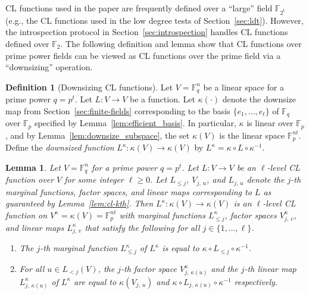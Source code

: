 \documentclass[11pt]{article}
\newtheorem{lemma}[theorem]{Lemma}
\theoremstyle{definition}
\newtheorem{definition}[theorem]{Definition}
\newcommand{\F}{\ensuremath{\mathbb{F}}}
\newcommand{\downsize}{\kappa}
\begin{document}
CL functions used in the paper are frequently defined over a ``large'' field
$\F_{2^t}$ (e.g., the CL functions used in the low degree tests of
Section~\ref{sec:ldt}).
However, the introspection protocol in Section~\ref{sec:introspection} handles
CL functions defined over $\F_2$.
The following definition and lemma show that CL functions over prime power
fields can be viewed as CL functions over the prime field via a ``downsizing''
operation.

\begin{definition}[Downsizing CL functions]
  \label{def:cl-downsize}
  Let $V = \F_{q}^n$ be a linear space for a prime power $q=p^t$.
  Let $L: V \to V$ be a function.
  Let $\downsize(\cdot)$ denote the downsize map from
  Section~\ref{sec:finite-fields} corresponding to the basis
  $\{e_1,\ldots,e_t\}$ of $\F_q$ over $\F_p$ specified by
  Lemma~\ref{lem:efficient_basis}.
  In particular, $\downsize$ is linear over $\F_p$, and by
  Lemma~\ref{lem:downsize_subspace}, the set $\downsize(V)$ is the linear space
  $\F_p^{nt}$.
  Define the \emph{downsized function} $L^\downsize : \downsize(V) \to
  \downsize(V)$ by $L^\downsize = \downsize \circ L \circ \downsize^{-1}$.
\end{definition}

\begin{lemma}
  \label{lem:cl-downsize}
	Let $V = \F_q^n$ for a prime power $q = p^t$.
  Let $L: V \to V$ be an $\ell$-level CL function over $V$ for some integer
  $\ell \ge 0$.
  Let $L_{\leq j}$, $V_{j,\, u}$, and $L_{j,\, u}$ denote the $j$-th marginal
  functions, factor spaces, and linear maps corresponding to $L$ as guaranteed
  by Lemma~\ref{lem:cl-kth}.
  Then $L^\downsize: \downsize(V) \to \downsize(V)$ is an $\ell$-level CL
  function on $V^\downsize = \downsize(V) = \F_p^{nt}$ with marginal functions
  $L^\downsize_{\leq j}$, factor spaces $V^\downsize_{j,\, v}$, and linear maps
  $L^\downsize_{j,\, v}$ that satisfy the following for all
  $j\in\{1,\ldots,\ell\}$.
  \begin{enumerate}
  \item The $j$-th marginal function $L^\downsize_{\leq j}$ of $L^\downsize$ is
    equal to $\downsize \circ L_{\leq j} \circ \downsize^{-1}$.
	\item For all $u \in L_{< j} (V)$, the $j$-th factor space $V_{j,\,
      \downsize(u)}^\downsize$ and the $j$-th linear map $L_{j,\,
      \downsize(u)}^\downsize$ of $L^\downsize$ are equal to $\downsize(V_{j,\,
      u})$ and $\downsize \circ L_{j,\, \downsize(u)} \circ \downsize^{-1}$ respectively.
  \end{enumerate}
\end{lemma}
\end{document}
